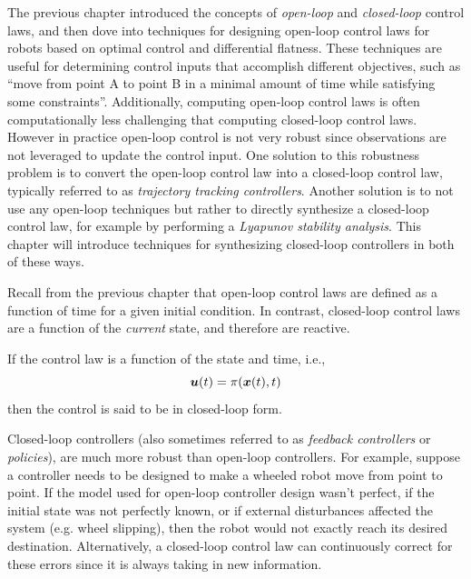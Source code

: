 The previous chapter introduced the concepts of \textit{open-loop} and \textit{closed-loop} control laws, and then dove into techniques for designing open-loop control laws for robots based on optimal control and differential flatness. These techniques are useful for determining control inputs that accomplish different objectives, such as ``move from point A to point B in a minimal amount of time while satisfying some constraints''. Additionally, computing open-loop control laws is often computationally less challenging that computing closed-loop control laws.
However in practice open-loop control is not very robust since observations are not leveraged to update the control input. One solution to this robustness problem is to convert the open-loop control law into a closed-loop control law, typically referred to as \textit{trajectory tracking controllers}. Another solution is to not use any open-loop techniques but rather to directly synthesize a closed-loop control law, for example by performing a \textit{Lyapunov stability analysis}.
This chapter will introduce techniques for synthesizing closed-loop controllers in both of these ways.

Recall from the previous chapter that open-loop control laws are defined as a function of time for a given initial condition. In contrast, closed-loop control laws are a function of the \textit{current} state, and therefore are reactive.

\begin{definition}
If the control law is a function of the state and time, i.e., 
\begin{equation}
\bm{u}(t) = \pi(\bm{x}(t), t )    
\end{equation}
then the control is said to be in closed-loop form.
\end{definition}

Closed-loop controllers (also sometimes referred to as \textit{feedback controllers} or \textit{policies}), are much more robust than open-loop controllers. For example, suppose a controller needs to be designed to make a wheeled robot move from point to point. If the model used for open-loop controller design wasn't perfect, if the initial state was not perfectly known, or if external disturbances affected the system (e.g. wheel slipping), then the robot would not exactly reach its desired destination. Alternatively, a closed-loop control law can continuously correct for these errors since it is always taking in new information.

